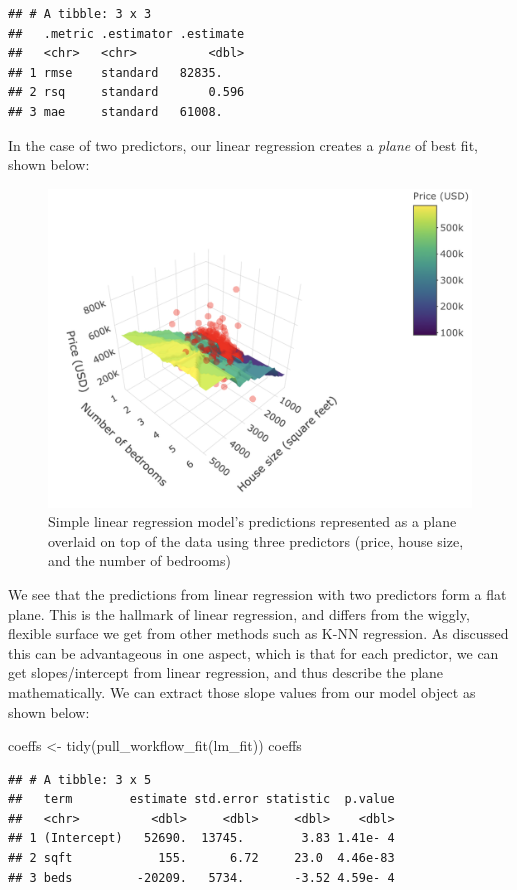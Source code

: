 \documentclass[
]{krantz}
\makeatletter
\newenvironment{Shaded}{\begin{snugshade}}{\end{snugshade}}
\newcommand{\FunctionTok}[1]{\textcolor[rgb]{0,0,0}{#1}}
\newcommand{\NormalTok}[1]{#1}
\newcommand{\OtherTok}[1]{\textcolor[rgb]{0.37,0.37,0.37}{#1}}
\newenvironment{kframe}{%
\medskip{}
\setlength{\fboxsep}{.8em}
 \def\at@end@of@kframe{}%
 \ifinner\ifhmode%
  \def\at@end@of@kframe{\end{minipage}}%
  \begin{minipage}{\columnwidth}%
 \fi\fi%
 \def\FrameCommand##1{\hskip\@totalleftmargin \hskip-\fboxsep
 \colorbox{shadecolor}{##1}\hskip-\fboxsep
     \hskip-\linewidth \hskip-\@totalleftmargin \hskip\columnwidth}%
 \MakeFramed {\advance\hsize-\width
   \@totalleftmargin\z@ \linewidth\hsize
   \@setminipage}}%
 {\par\unskip\endMakeFramed%
 \at@end@of@kframe}
\renewenvironment{Shaded}{\begin{kframe}}{\end{kframe}}
\makeatother
\begin{document}
\begin{verbatim}
## # A tibble: 3 x 3
##   .metric .estimator .estimate
##   <chr>   <chr>          <dbl>
## 1 rmse    standard   82835.   
## 2 rsq     standard       0.596
## 3 mae     standard   61008.
\end{verbatim}

In the case of two predictors, our linear regression creates a \emph{plane} of best fit, shown below:

\begin{figure}
\includegraphics[width=0.7\linewidth]{img/knn-regr_3d} \caption{Simple linear regression model’s predictions represented as a plane overlaid on top of the data using three predictors (price, house size, and the number of bedrooms)}\label{fig:08-3DlinReg}
\end{figure}

We see that the predictions from linear regression with two predictors form a
flat plane. This is the hallmark of linear regression, and differs from the
wiggly, flexible surface we get from other methods such as K-NN regression.
As discussed this can be advantageous in one aspect, which is that for each
predictor, we can get slopes/intercept from linear regression, and thus describe the
plane mathematically. We can extract those slope values from our model object
as shown below:

\begin{Shaded}
\begin{Highlighting}[]
\NormalTok{coeffs }\OtherTok{\textless{}{-}} \FunctionTok{tidy}\NormalTok{(}\FunctionTok{pull\_workflow\_fit}\NormalTok{(lm\_fit))}
\NormalTok{coeffs}
\end{Highlighting}
\end{Shaded}

\begin{verbatim}
## # A tibble: 3 x 5
##   term        estimate std.error statistic  p.value
##   <chr>          <dbl>     <dbl>     <dbl>    <dbl>
## 1 (Intercept)   52690.  13745.        3.83 1.41e- 4
## 2 sqft            155.      6.72     23.0  4.46e-83
## 3 beds         -20209.   5734.       -3.52 4.59e- 4
\end{verbatim}
\end{document}
